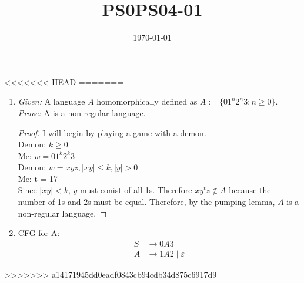 \documentclass{article}
\title{PS0}
\title{PS04-01}
\date{\today}
\begin{document}
\maketitle
<<<<<<< HEAD
=======
\begin{enumerate}[label=\alph*.]
	\item \textit{Given: } A language $A$ homomorphically defined as $A := \{01^n2^n3 : n \geq 0\}$.\\
	\textit{Prove: } A is a non-regular language.
	\begin{proof}
	I will begin by playing a game with a demon.\\
	Demon: $k \geq 0$\\
	Me: $w = 01^k2^k3$\\
	Demon: $w = xyz, \mid xy \mid \leq k, \mid y \mid > 0$\\
	Me: t = 17\\
	Since $\mid xy \mid < k$, $y$ must conist of all 1s. Therefore $xy^tz \notin A$ because the number of 1s and 2s must be equal. Therefore, by the pumping lemma, $A$ is a non-regular language. 
	\end{proof}
	\item CFG for A:\\
	\begin{align*}
		S &\rightarrow 0A3\\
		A &\rightarrow 1A2 \mid \varepsilon
	\end{align*}
\end{enumerate}
>>>>>>> a14171945dd0eadf0843cb94cdb34d875c6917d9
\end{document}
